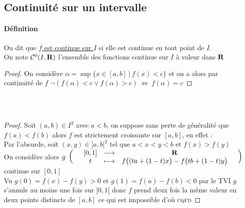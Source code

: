 \subsection{Continuité sur un intervalle}
    \traitd \paragraph{Définition}
        On dit que \uline{$f$ est continue sur $I$} si elle est continue en tout point de $I$.\\
        On note ${\mathcal{C}}^0 (I,{\mathbf{R}})$ l'ensemble des fonctions continue sur $I$ à valeur dans ${\mathbf{R}}$ \trait
    \begin{proof}
    On considère $\alpha = \sup \{ x\in[a,b] ~|~ f(x)<c\}$ et on a alors par continuité de $f$ $\neg (f(\alpha)<c \vee f(\alpha)>c)~\Leftrightarrow ~f(\alpha)=c$
    \end{proof}
    ${}$ \\ 
    \vspace*{0.5cm} \\ 
    \vspace*{0.5cm} \\ 
    \begin{proof}
    Soit $(a,b) \in I^2$ avec $a<b$, on suppose sans perte de généralité que $f(a)<f(b)$ alors $f$ est strictement croissante sur $[a,b]$, en effet : \vspace*{0.2cm} \\
    Par l'absurde, soit $(x,y)\in ]a,b[^2$ tel que $a<x<y<b$ et $f(x)>f(y)$\\
    On considère alors $g~\left( \begin{array}{ccccc} & [0,1] & \longrightarrow & {\mathbf{R}} & \\ & t & \longmapsto & f\big((ta+(1-t)x\big) - f\big( tb+(1-t)y\big) & \end{array} \right)$  continue sur $[0,1]$\\
    Vu $g(0) = f(x)-f(y)>0$ et $g(1) = f(a)-f(b)<0$ par le TVI $g$ s'annule au moins une fois sur $]0,1[$ donc $f$ prend deux fois la même valeur en deux points distincts de $[a,b]$ ce qui est impossible d'où \textsc{cqfd}
    \end{proof}
